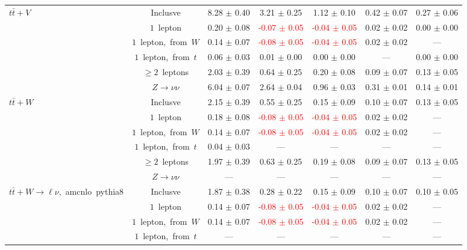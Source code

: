 \documentclass{article}
\begin{document}
\begin{longtable}{|l|c|c|c|c|c|c|}
\hline 
\multirow{6}{*}{$t\bar{t}+V$} & Inclusve  & 8.28 $\pm$ 0.40  & 3.21 $\pm$ 0.25  & 1.12 $\pm$ 0.10  & 0.42 $\pm$ 0.07  & 0.27 $\pm$ 0.06 \\* 
 & $1$~lepton  & 0.20 $\pm$ 0.08  & \textcolor{red}{ -0.07 $\pm$ 0.05 }  & \textcolor{red}{ -0.04 $\pm$ 0.05 }  & 0.02 $\pm$ 0.02  & 0.00 $\pm$ 0.00 \\* 
 & $1$~lepton,~from~$W$  & 0.14 $\pm$ 0.07  & \textcolor{red}{ -0.08 $\pm$ 0.05 }  & \textcolor{red}{ -0.04 $\pm$ 0.05 }  & 0.02 $\pm$ 0.02  & --- \\* 
 & $1$~lepton,~from~$t$  & 0.06 $\pm$ 0.03  & 0.01 $\pm$ 0.00  & 0.00 $\pm$ 0.00  & ---  & 0.00 $\pm$ 0.00 \\* 
 & $\ge2$~leptons  & 2.03 $\pm$ 0.39  & 0.64 $\pm$ 0.25  & 0.20 $\pm$ 0.08  & 0.09 $\pm$ 0.07  & 0.13 $\pm$ 0.05 \\* 
 & $Z\rightarrow\nu\nu$  & 6.04 $\pm$ 0.07  & 2.64 $\pm$ 0.04  & 0.96 $\pm$ 0.03  & 0.31 $\pm$ 0.01  & 0.14 $\pm$ 0.01 \\* 
\hline 
\multirow{6}{*}{$t\bar{t}+W$} & Inclusve  & 2.15 $\pm$ 0.39  & 0.55 $\pm$ 0.25  & 0.15 $\pm$ 0.09  & 0.10 $\pm$ 0.07  & 0.13 $\pm$ 0.05 \\* 
 & $1$~lepton  & 0.18 $\pm$ 0.08  & \textcolor{red}{ -0.08 $\pm$ 0.05 }  & \textcolor{red}{ -0.04 $\pm$ 0.05 }  & 0.02 $\pm$ 0.02  & --- \\* 
 & $1$~lepton,~from~$W$  & 0.14 $\pm$ 0.07  & \textcolor{red}{ -0.08 $\pm$ 0.05 }  & \textcolor{red}{ -0.04 $\pm$ 0.05 }  & 0.02 $\pm$ 0.02  & --- \\* 
 & $1$~lepton,~from~$t$  & 0.04 $\pm$ 0.03  & ---  & ---  & ---  & --- \\* 
 & $\ge2$~leptons  & 1.97 $\pm$ 0.39  & 0.63 $\pm$ 0.25  & 0.19 $\pm$ 0.08  & 0.09 $\pm$ 0.07  & 0.13 $\pm$ 0.05 \\* 
 & $Z\rightarrow\nu\nu$  & ---  & ---  & ---  & ---  & --- \\* 
\hline 
\multirow{6}{*}{$t\bar{t}+W{\rightarrow}{\ell}{\nu}$,~amcnlo~pythia8} & Inclusve  & 1.87 $\pm$ 0.38  & 0.28 $\pm$ 0.22  & 0.15 $\pm$ 0.09  & 0.10 $\pm$ 0.07  & 0.10 $\pm$ 0.05 \\* 
 & $1$~lepton  & 0.14 $\pm$ 0.07  & \textcolor{red}{ -0.08 $\pm$ 0.05 }  & \textcolor{red}{ -0.04 $\pm$ 0.05 }  & 0.02 $\pm$ 0.02  & --- \\* 
 & $1$~lepton,~from~$W$  & 0.14 $\pm$ 0.07  & \textcolor{red}{ -0.08 $\pm$ 0.05 }  & \textcolor{red}{ -0.04 $\pm$ 0.05 }  & 0.02 $\pm$ 0.02  & --- \\* 
 & $1$~lepton,~from~$t$  & ---  & ---  & ---  & ---  & --- \\* 

\end{longtable}
\end{document}
